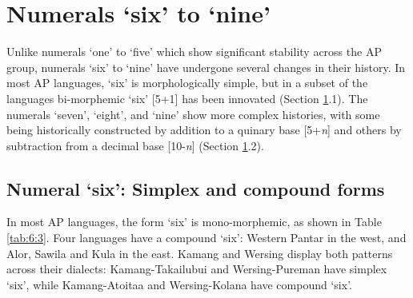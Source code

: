 \documentclass[output=paper]{LSP/langsci}
\begin{document}
\section{Numerals `six' to `nine'}\label{sec:6:5}
Unlike numerals `one' to `five' which show significant stability across the AP group, numerals `six' to `nine' have undergone several changes in their history. In most AP languages, `six' is morphologically simple, but in a subset of the languages bi-morphemic `six' [5+1] has been innovated (Section \ref{sec:6:5}.1). The numerals `seven', `eight', and `nine' show more complex histories, with some being historically constructed by addition to a quinary base [5+\textit{n}] and others by subtraction from a decimal base [10-\textit{n}] (Section \ref{sec:6:5}.2). 

\subsection{Numeral `six': Simplex and compound forms} 
In most AP languages, the form `six' is mono-morphemic, as shown in Table \ref{tab:6:3}. Four languages have a compound `six': Western Pantar in the west, and Alor, Sawila and Kula in the east. Kamang and Wersing display both patterns across their dialects: Kamang-Takailubui and Wersing-Pureman have simplex `six', while Kamang-Atoitaa and Wersing-Kolana have compound `six'. 

 
\end{document}
